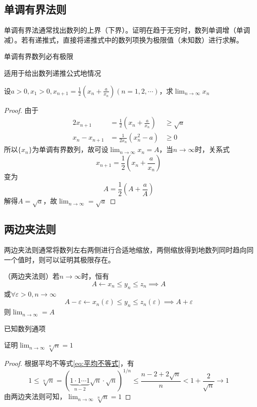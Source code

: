 \pagebreak
\subsection{单调有界法则}
单调有界法通常找出数列的上界（下界）。证明在趋于无穷时，数列单调增（单调减）。若有递推式，直接将递推式中的数列项换为极限值（未知数）进行求解。
\begin{theorem}
    \label{th:单调有界法则}
    单调有界数列必有极限
\end{theorem}
\begin{situation}
    适用于给出数列递推公式地情况
\end{situation}
\begin{example}
    设$a>0, x_1 > 0, x_{n+1} = \frac{1}{2}(x_n+\frac{a}{x_n}) (n=1,2,\cdots)$，求$\lim_{n\to\infty}x_n$
\end{example}
\begin{proof}
    由于
    \begin{alignat*}{2}
        x_{n+1}         & = \frac{1}{2}(x_n+\frac{a}{x_n}) & \geq  \sqrt{a} \\
        x_{n} - x_{n+1} & = \frac{1}{2x_n}(x_n^2-a)        & \geq  0
    \end{alignat*}
    所以$\{x_n\}$为单调有界数列，故可设$\lim_{n\to\infty} x_n = A$，当$n\to\infty$时，关系式
    \[ x_{n+1} = \frac{1}{2}(x_n+\frac{a}{x_n}) \]
    变为
    \[ A = \frac{1}{2}(A+\frac{a}{A}) \]
    解得$A=\sqrt{a}$，故$\lim_{n\to\infty}=\sqrt{a}$
\end{proof}

\subsection{两边夹法则}
两边夹法则通常将数列左右两侧进行合适地缩放，两侧缩放得到地数列同时趋向同一个值时，则可以证明其极限存在。
\begin{theorem}
    \label{th:两边夹法则}
    （两边夹法则）若$n\to\infty$时，恒有
    \[ A \leftarrow x_n \leq y_n \leq z_n \implies A \]
    或$\forall \varepsilon > 0, n\to\infty$
    \[ A -\varepsilon \leftarrow x_n(\varepsilon) \leq y_n \leq z_n(\varepsilon) \implies A + \varepsilon \]
    则$\lim_{n \to\infty}=A$
\end{theorem}
\begin{situation}
    已知数列通项
\end{situation}
\begin{example}
    证明$\lim_{n\to\infty}\sqrt[n]{n} = 1$
\end{example}
\begin{proof}
    根据平均不等式\ref{eq:平均不等式}，有
    \[ 1 \leq \sqrt[n]{n} = (\underbrace{1\cdot 1\cdots 1}_{n-2}\sqrt{n}\cdot\sqrt{n})^{1/n}\leq \frac{n-2+2\sqrt{n}}{n} < 1+\frac{2}{\sqrt{n}} \to 1 \]
    由两边夹法则可知，$\lim_{n\to\infty}\sqrt[n]{n} = 1$
\end{proof}

